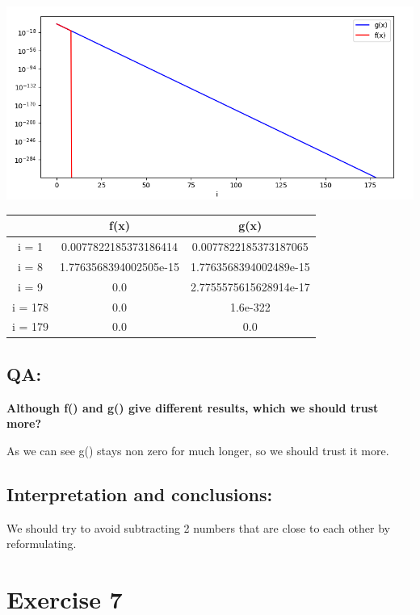 \documentclass{article}
\begin{document}
\begin{center}
    \includegraphics[scale=0.6]{f_and_g_functions} 
\end{center}

\begin{center}
    \begin{tabular}{| c | c | c |}
        \hline
         & f(x) & g(x)\\ 
        \hline
        i = 1 & 0.0077822185373186414 & 0.0077822185373187065\\
        \hline
        i = 8 & 1.7763568394002505e-15 & 1.7763568394002489e-15\\
        \hline
        i = 9 & 0.0 & 2.7755575615628914e-17\\
        \hline
        i = 178 & 0.0 & 1.6e-322\\
        \hline
        i = 179 & 0.0 & 0.0\\
        \hline
    \end{tabular}
    \end{center}
    \subsection*{QA:}

    \begin{center}
        \textbf{Although f() and g() give different results, which we should trust more?}
    \end{center}
    As we can see g() stays non zero for much longer, so we should trust it more.

    \subsection*{Interpretation and conclusions:}
We should try to avoid subtracting 2 numbers that are close to each other by reformulating.

\section*{Exercise 7}
\end{document}
